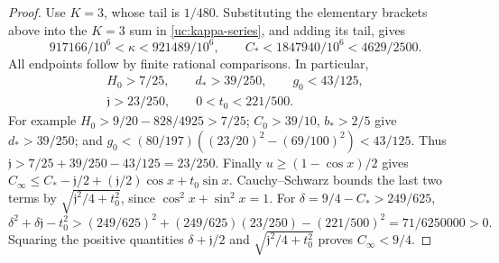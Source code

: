 \begin{proof}
Use $K=3$, whose tail is $1/480$. Substituting the elementary brackets above into the $K=3$ sum in
\eqref{uc:kappa-series}, and adding its tail, gives
\[
917166/10^6<\kappa<921489/10^6,\qquad
C_*<1847940/10^6<4629/2500.
\]
All endpoints follow by finite rational comparisons. In particular,
\begin{equation}\label{uc:scalar-constants}
 \begin{gathered}
 H_0>7/25,\qquad d_*>39/250,\qquad g_0<43/125,\\
 \mathfrak j>23/250,\qquad 0<t_0<221/500.
 \end{gathered}
\end{equation}
For example $H_0>9/20-828/4925>7/25$;
$C_0>39/10$, $b_*>2/5$ give $d_*>39/250$;
and $g_0<(80/197)((23/20)^2-(69/100)^2)<43/125$.
Thus $\mathfrak j>7/25+39/250-43/125=23/250$.
Finally $u\geq(1-\cos x)/2$ gives
$C_\infty\leq C_*-\mathfrak j/2+(\mathfrak j/2)\cos x+t_0\sin x$.
Cauchy--Schwarz bounds the last two terms by
$\sqrt{\mathfrak j^2/4+t_0^2}$, since $\cos^2x+\sin^2x=1$.
For $\delta=9/4-C_*>249/625$,
\[
 \delta^2+\delta\mathfrak j-t_0^2>
 (249/625)^2+(249/625)(23/250)-(221/500)^2
 =71/6250000>0.
\]
Squaring the positive quantities $\delta+\mathfrak j/2$ and
$\sqrt{\mathfrak j^2/4+t_0^2}$ proves $C_\infty<9/4$.
\end{proof}

